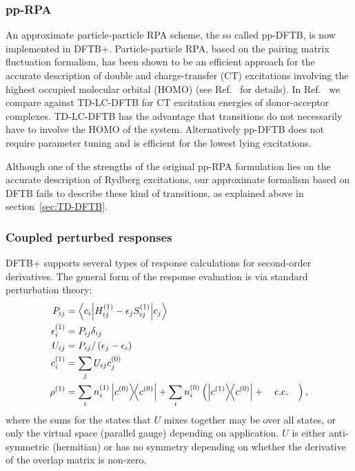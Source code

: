 \documentclass[reprint,onecolumn,superscriptaddress]{revtex4-1}
\newcommand{\dftbp}{DFTB+}
\begin{document}
\subsubsection{pp-RPA}

An approximate particle-particle RPA scheme, the so called
pp-DFTB,\cite{Kranz2017} is now implemented in DFTB+. Particle-particle RPA,
based on the pairing matrix fluctuation formalism, has been shown to be an
efficient approach for the accurate description of double and charge-transfer
(CT) excitations involving the highest occupied molecular orbital (HOMO) (see
Ref.~\cite{Yang2017} for details).  In Ref.~\cite{Kranz2017} we
compare against TD-LC-DFTB for CT excitation energies of donor-acceptor
complexes. TD-LC-DFTB has the advantage that transitions do not necessarily have
to involve the HOMO of the system. Alternatively pp-DFTB does not require
parameter tuning and is efficient for the lowest lying excitations.

Although one of the strengths of the original pp-RPA formulation lies on the
accurate description of Rydberg excitations, our approximate formalism based on
DFTB fails to describe these kind of transitions, as explained above in
section~\ref{sec:TD-DFTB}.

\subsubsection{Coupled perturbed responses}

\dftbp{} supports several types of response calculations for second-order
derivatives. The general form of the response evaluation is via standard
perturbation theory:
\begin{align}
  P_{ij} &= \mel**{c_i}{H^{(1)}_{ij} - \epsilon_j S^{(1)}_{ij}}{c_j}\\
  \epsilon_i^{(1)} &= P_{ij} \delta_{ij}\\
  U_{ij} &= P_{ij} / \left( \epsilon_j - \epsilon_i \right)\\
  c_i^{(1)} &= \sum_j U_{ij} c_j^{(0)}\\
  \rho^{(1)} &= \sum_i n^{(1)}_i \dyad{c^{(0)}} + \sum_i n^{(0)}_i \left(
               \dyad{c^{(1)}}{c^{(0)}} + \qcc\right),
\end{align}
where the sums for the states that $U$ mixes together may be over all states, or only
the virtual space (parallel gauge) depending on application. $U$ is either
anti-symmetric (hermitian) or has no symmetry depending on whether the derivative
of the overlap matrix is non-zero.
\end{document}
